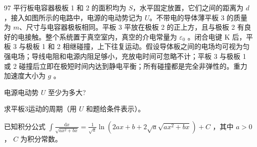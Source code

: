 \begin{problem}[第35届全国中学生物理竞赛决赛][平行板电容器与导体板运动]{97}
    平行板电容器极板 1 和 2 的面积均为 $S$，水平固定放置，它们之间的距离为 $d$，接入如图所示的电路中，电源的电动势记为 $U$。不带电的导体薄平板 3 的质量为 $m$、尺寸与电容器极板相同。平板 3 平放在极板 2 的正上方，且与极板 2 有良好的电接触。整个系统置于真空室内，真空的介电常量为 $\varepsilon_{0}$ 。闭合电键 K 后，平板 3 与极板 1 和 2 相继碰撞，上下往复运动。假设导体板之间的电场均可视为匀强电场；导线电阻和电源内阻足够小，充放电时间可忽略不计；平板 3 与极板 1 或 2 碰撞后立即在极短时间内达到静电平衡；所有碰撞都是完全非弹性的。重力加速度大小为 $g$ 。
    \begin{subproblem}
        电源电动势 $U$ 至少为多大?
    \end{subproblem}
    \begin{subproblem}
        求平板3运动的周期（用 $U$ 和题给条件表示）。

        已知积分公式
        $\int \frac{\mathrm{d}x}{\sqrt{ax^2 + bx}} = \frac{1}{\sqrt{a}}\ln \left(2ax + b + 2\sqrt{a}\sqrt{ax^2 + bx}\right) + C$ ，其中 $a > 0$ ， $C$ 为积分常数。
    \end{subproblem}
\end{problem}